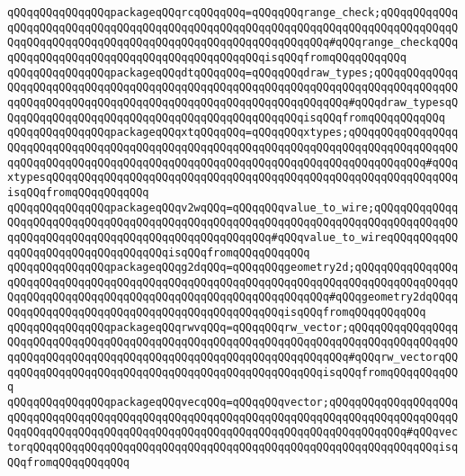 \verb|qQQqqQQqqQQqqQQqpackageqQQqrcqQQqqQQq=qQQqqQQqrange_check;qQQqqQQqqQQqqQQqqQQqqQQqqQQqqQQqqQQqqQQqqQQqqQQqqQQqqQQqqQQqqQQqqQQqqQQqqQQqqQQqqQQqqQQqqQQqqQQqqQQqqQQqqQQqqQQqqQQqqQQqqQQqqQQqqQQq#qQQqrange_checkqQQqqQQqqQQqqQQqqQQqqQQqqQQqqQQqqQQqqQQqqQQqisqQQqfromqQQqqQQqqQQq|\newline
\verb|qQQqqQQqqQQqqQQqpackageqQQqdtqQQqqQQq=qQQqqQQqdraw_types;qQQqqQQqqQQqqQQqqQQqqQQqqQQqqQQqqQQqqQQqqQQqqQQqqQQqqQQqqQQqqQQqqQQqqQQqqQQqqQQqqQQqqQQqqQQqqQQqqQQqqQQqqQQqqQQqqQQqqQQqqQQqqQQqqQQqqQQq#qQQqdraw_typesqQQqqQQqqQQqqQQqqQQqqQQqqQQqqQQqqQQqqQQqqQQqqQQqisqQQqfromqQQqqQQqqQQq|\newline
\verb|qQQqqQQqqQQqqQQqpackageqQQqxtqQQqqQQq=qQQqqQQqxtypes;qQQqqQQqqQQqqQQqqQQqqQQqqQQqqQQqqQQqqQQqqQQqqQQqqQQqqQQqqQQqqQQqqQQqqQQqqQQqqQQqqQQqqQQqqQQqqQQqqQQqqQQqqQQqqQQqqQQqqQQqqQQqqQQqqQQqqQQqqQQqqQQqqQQqqQQq#qQQqxtypesqQQqqQQqqQQqqQQqqQQqqQQqqQQqqQQqqQQqqQQqqQQqqQQqqQQqqQQqqQQqqQQqisqQQqfromqQQqqQQqqQQq|\newline
\verb|qQQqqQQqqQQqqQQqpackageqQQqv2wqQQq=qQQqqQQqvalue_to_wire;qQQqqQQqqQQqqQQqqQQqqQQqqQQqqQQqqQQqqQQqqQQqqQQqqQQqqQQqqQQqqQQqqQQqqQQqqQQqqQQqqQQqqQQqqQQqqQQqqQQqqQQqqQQqqQQqqQQqqQQqqQQq#qQQqvalue_to_wireqQQqqQQqqQQqqQQqqQQqqQQqqQQqqQQqqQQqisqQQqfromqQQqqQQqqQQq|\newline
\verb|qQQqqQQqqQQqqQQqpackageqQQqg2dqQQq=qQQqqQQqgeometry2d;qQQqqQQqqQQqqQQqqQQqqQQqqQQqqQQqqQQqqQQqqQQqqQQqqQQqqQQqqQQqqQQqqQQqqQQqqQQqqQQqqQQqqQQqqQQqqQQqqQQqqQQqqQQqqQQqqQQqqQQqqQQqqQQqqQQqqQQq#qQQqgeometry2dqQQqqQQqqQQqqQQqqQQqqQQqqQQqqQQqqQQqqQQqqQQqqQQqisqQQqfromqQQqqQQqqQQq|\newline
\verb|qQQqqQQqqQQqqQQqpackageqQQqrwvqQQq=qQQqqQQqrw_vector;qQQqqQQqqQQqqQQqqQQqqQQqqQQqqQQqqQQqqQQqqQQqqQQqqQQqqQQqqQQqqQQqqQQqqQQqqQQqqQQqqQQqqQQqqQQqqQQqqQQqqQQqqQQqqQQqqQQqqQQqqQQqqQQqqQQqqQQqqQQq#qQQqrw_vectorqQQqqQQqqQQqqQQqqQQqqQQqqQQqqQQqqQQqqQQqqQQqqQQqqQQqisqQQqfromqQQqqQQqqQQq|\newline
\verb|qQQqqQQqqQQqqQQqpackageqQQqvecqQQq=qQQqqQQqvector;qQQqqQQqqQQqqQQqqQQqqQQqqQQqqQQqqQQqqQQqqQQqqQQqqQQqqQQqqQQqqQQqqQQqqQQqqQQqqQQqqQQqqQQqqQQqqQQqqQQqqQQqqQQqqQQqqQQqqQQqqQQqqQQqqQQqqQQqqQQqqQQqqQQqqQQq#qQQqvectorqQQqqQQqqQQqqQQqqQQqqQQqqQQqqQQqqQQqqQQqqQQqqQQqqQQqqQQqqQQqqQQqisqQQqfromqQQqqQQqqQQq|\newline
